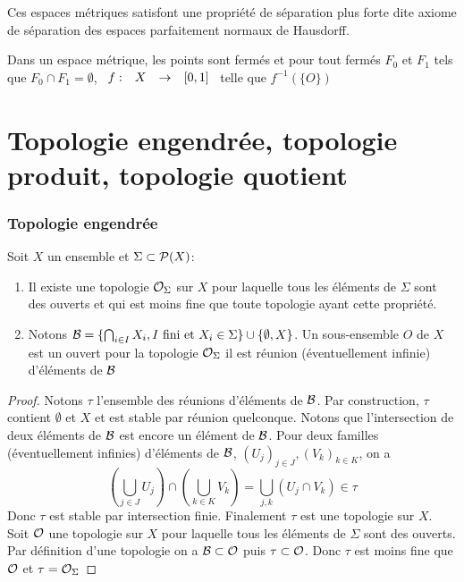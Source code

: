 \documentclass[]{report}
\begin{document}
    \begin{re}{}{}
        Ces espaces métriques satisfont une propriété de séparation plus forte dite axiome de séparation des espaces parfaitement normaux de Hausdorff.
    \end{re}

    \begin{re}{}{}
        Dans un espace métrique, les points sont fermés et pour tout fermés $F_0$ et $F_1$ tels que $F_0\cap F_1=\emptyset$, $\begin{array}{ccccc} f : & X & \to & [0,1] \end{array}$ telle que $f^{-1}(\{O\})$
    \end{re}

    \section{Topologie engendrée, topologie produit, topologie quotient}

    \subsubsection*{Topologie engendrée}

    \begin{dfprop}{}{}
        Soit $X$ un ensemble et $\Sigma\subset\mathcal{P}(X)$:
        \begin{enumerate}
            \item Il existe une topologie $\mathcal{O}_\Sigma$ sur $X$ pour laquelle tous les éléments de $\Sigma$ sont des ouverts et qui est moins fine que toute topologie ayant cette propriété.
            \item Notons $\mathcal{B}=\{\bigcap_{i\in I}X_i,\text{$I$ fini et }X_i\in\Sigma\}\cup\{\emptyset,X\}$. Un sous-ensemble $O$ de $X$ est un ouvert pour la topologie $\mathcal{O}_\Sigma$ \ssi il est réunion (éventuellement infinie) d'éléments de $\mathcal{B}$
        \end{enumerate}
    \end{dfprop}

    \begin{proof}{}{}
        Notons $\tau$ l'ensemble des réunions d'éléments de $\mathcal{B}$. Par construction, $\tau$ contient $\emptyset$ et $X$ et est stable par réunion quelconque. Notons que l'intersection de deux éléments de $\mathcal{B}$ est encore un élément de $\mathcal{B}$. Pour deux familles (éventuellement infinies) d'éléments de $\mathcal{B}$, $(U_j)_{j\in J},(V_k)_{k\in K}$, on a
        \[\left(\bigcup_{j\in J} U_j\right)\cap\left(\bigcup_{k\in K} V_k\right)=\bigcup_{j,k}\left(U_j\cap V_k\right)\in \tau\]
        Donc $\tau$ est stable par intersection finie. Finalement $\tau$ est une topologie sur $X$. Soit $\mathcal{O}$ une topologie sur $X$ pour laquelle tous les éléments de $\Sigma$ sont des ouverts. Par définition d'une topologie on a $\mathcal{B}\subset \mathcal{O}$ puis $\tau\subset \mathcal{O}$. Donc $\tau$ est moins fine que $\mathcal{O}$ et $\tau=\mathcal{O}_{\Sigma}$ 
    \end{proof}
\end{document}
